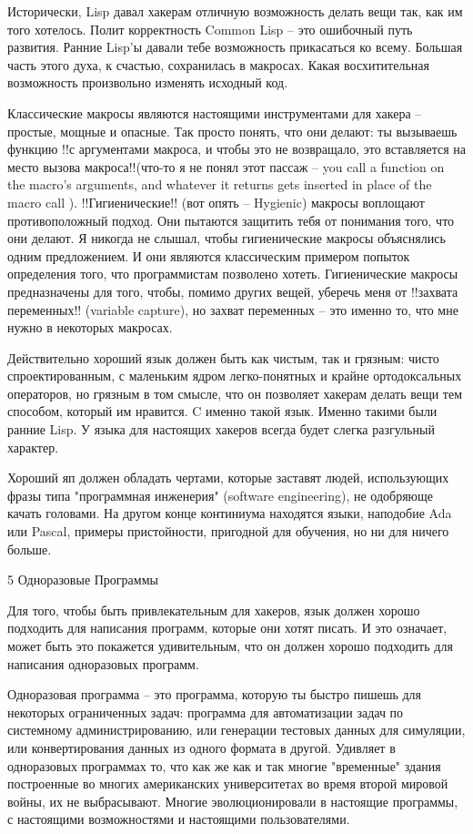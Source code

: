 \documentclass[ebook,12pt,oneside,openany]{memoir}
\begin{document}
Исторически, Lisp давал хакерам отличную возможность делать вещи так,
как им того хотелось. Полит корректность Common Lisp -- это ошибочный
путь развития. Ранние Lisp'ы давали тебе возможность прикасаться ко
всему. Большая часть этого духа, к счастью, сохранилась в макросах.
Какая восхитительная возможность произвольно изменять исходный код.

Классические макросы являются настоящими инструментами для хакера --
простые, мощные и опасные. Так просто понять, что они делают: ты
вызываешь функцию !!с аргументами макроса, и чтобы это не возвращало,
это вставляется на место вызова макроса!!(что-то я не понял этот
пассаж -- you call a function on the macro's arguments, and whatever
it returns gets inserted in place of the macro call ).
!!Гигиенические!! (вот опять -- Hygienic) макросы воплощают
противоположный подход. Они пытаются защитить тебя от понимания того,
что они делают. Я никогда не слышал, чтобы гигиенические макросы
объяснялись одним предложением. И они являются классическим примером
попыток определения того, что программистам позволено хотеть.
Гигиенические макросы предназначены для того, чтобы, помимо других
вещей, уберечь меня от !!захвата переменных!! (variable capture), но
захват переменных -- это именно то, что мне нужно в некоторых
макросах.

Действительно хороший язык должен быть как чистым, так и грязным:
чисто спроектированным, с маленьким ядром легко-понятных и крайне
ортодоксальных операторов, но грязным в том смысле, что он позволяет
хакерам делать вещи тем способом, который им нравится. C именно такой
язык. Именно такими были ранние Lisp. У языка для настоящих хакеров
всегда будет слегка разгульный характер.

Хороший яп должен обладать чертами, которые заставят людей,
использующих фразы типа "программная инженерия" (software
engineering), не одобряюще качать головами. На другом конце континиума
находятся языки, наподобие Ada или Pascal, примеры пристойности,
пригодной для обучения, но ни для ничего больше.

5 Одноразовые Программы

Для того, чтобы быть привлекательным для хакеров, язык должен хорошо
подходить для написания программ, которые они хотят писать. И это
означает, может быть это покажется удивительным, что он должен хорошо
подходить для написания одноразовых программ.

Одноразовая программа -- это программа, которую ты быстро пишешь для
некоторых ограниченных задач: программа для автоматизации задач по
системному администрированию, или генерации тестовых данных для
симуляции, или конвертирования данных из одного формата в другой.
Удивляет в одноразовых программах то, что как же как и так многие
"временные" здания построенные во многих американских университетах во
время второй мировой войны, их не выбрасывают. Многие эволюционировали
в настоящие программы, с настоящими возможностями и настоящими
пользователями.
\end{document}
